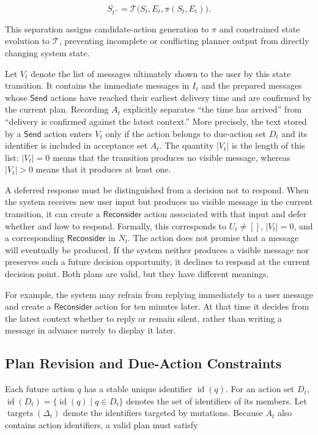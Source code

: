 \documentclass[manuscript,nonacm]{acmart}
\begin{document}
\begin{equation}
S_{t^+}=\mathcal{T}\bigl(S_t,E_t,\pi(S_t,E_t)\bigr).
\end{equation}

This separation assigns candidate-action generation to $\pi$ and constrained
state evolution to $\mathcal{T}$, preventing incomplete or conflicting planner
output from directly changing system state.

Let $V_t$ denote the list of messages ultimately shown to the user by this state
transition. It contains the immediate messages in $I_t$ and the prepared messages
whose $\mathsf{Send}$ actions have reached their earliest delivery time and are
confirmed by the current plan. Recording $A_t$ explicitly separates ``the time
has arrived'' from ``delivery is confirmed against the latest context.'' More
precisely, the text stored by a $\mathsf{Send}$ action enters $V_t$ only if the
action belongs to due-action set $D_t$ and its identifier is included in
acceptance set $A_t$. The quantity $|V_t|$ is the length of this list:
$|V_t|=0$ means that the transition produces no visible message, whereas
$|V_t|>0$ means that it produces at least one.

A deferred response must be distinguished from a decision not to respond. When
the system receives new user input but produces no visible message in the
current transition, it can create a $\mathsf{Reconsider}$ action associated with
that input and defer whether and how to respond. Formally, this corresponds to
$U_t\neq[]$, $|V_t|=0$, and a corresponding $\mathsf{Reconsider}$ in $N_t$.
The action does not promise that a message will eventually be produced. If the
system neither produces a visible message nor preserves such a future decision
opportunity, it declines to respond at the current decision point. Both plans
are valid, but they have different meanings.

For example, the system may refrain from replying immediately to a user message
and create a $\mathsf{Reconsider}$ action for ten minutes later. At that time it
decides from the latest context whether to reply or remain silent, rather than
writing a message in advance merely to display it later.

\subsection{Plan Revision and Due-Action Constraints}

Each future action $q$ has a stable unique identifier $\operatorname{id}(q)$.
For an action set $D_t$, $\operatorname{id}(D_t)=
\{\operatorname{id}(q)\mid q\in D_t\}$ denotes the set of identifiers of its
members. Let $\operatorname{targets}(\Delta_t)$ denote the identifiers targeted
by mutations. Because $A_t$ also contains action identifiers, a valid plan must
satisfy
\end{document}
